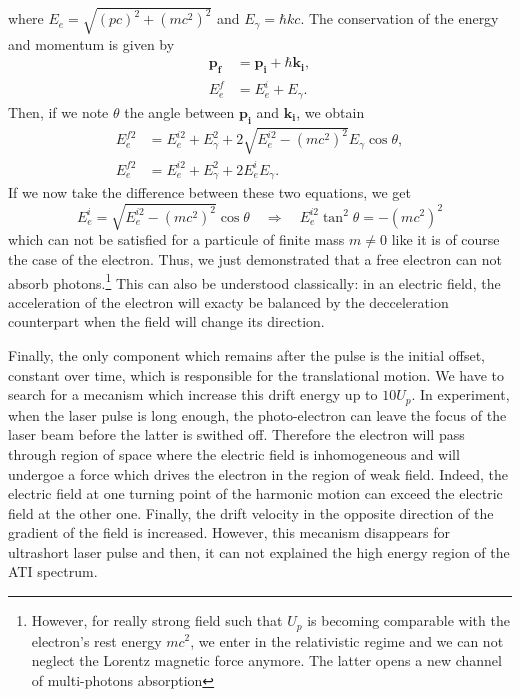 \documentclass[a4paper]{article}
\begin{document}
where $E_{e}=\sqrt{(pc)^{2}+(mc^{2})^{2}}$ and $E_{\gamma}=\hbar kc$.
The conservation of the energy and momentum is given by
\begin{align}
\label{momentum_conservation}
\mathbf{p_{f}}&=\mathbf{p_{i}}+\hbar \mathbf{k_{i}}, \\
\label{energy_conservation}
E_{e}^{f}&=E_{e}^{i}+E_{\gamma}.
\end{align}
Then, if we note $\theta$ the angle between $\mathbf{p_{i}}$ and $\mathbf{k_{i}}$, we obtain
\begin{align}
E_{e}^{f2}&=E_{e}^{i2}+E_{\gamma}^{2}+2\sqrt{E_{e}^{i2}-(mc^{2})^{2}}E_{\gamma}\cos{\theta}, \\
E_{e}^{f2}&=E_{e}^{i2}+E_{\gamma}^{2}+2 E_{e}^{i}E_{\gamma}.
\end{align}
If we now take the difference between these two equations, we get
\begin{equation}
E_{e}^{i}=\sqrt{E_{e}^{i2}-(mc^{2})^{2}}\cos{\theta} \quad \Rightarrow \quad E_{e}^{i2} \tan^{2}{\theta} = -(mc^{2})^{2}
\end{equation}
which can not be satisfied for a particule of finite mass $m\neq0$ like it is of course the case of the electron. Thus, we just demonstrated that a free electron can not absorb photons.\footnote{However, for really strong field such that $U_{p}$ is becoming comparable with the electron's rest energy $mc^{2}$, we enter in the relativistic regime and we can not neglect the Lorentz magnetic force anymore. The latter opens a new channel of multi-photons absorption}
This can also be understood classically: in an electric field, the acceleration of the electron will exacty be balanced by the decceleration counterpart when the field will change its direction.
\par
Finally, the only component which remains after the pulse is the initial offset, constant over time, which is responsible for the translational motion. We have to search for a mecanism which increase this drift energy up to $10 U_{p}$.
In experiment, when the laser pulse is long enough, the photo-electron can leave the focus of the laser beam before the latter is swithed off. Therefore the electron will pass through region of space where the electric field is inhomogeneous and will undergoe a force which drives the electron in the region of weak field. Indeed, the electric field at one turning point of the harmonic motion can exceed the electric field at the other one. Finally, the drift velocity in the opposite direction of the gradient of the field is increased. However, this mecanism disappears for ultrashort laser pulse and then, it can not explained the high energy region of the ATI spectrum.
\end{document}
